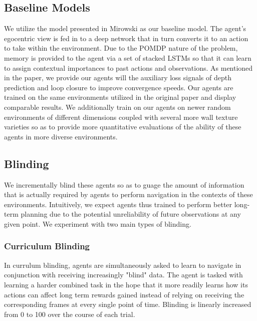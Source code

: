 
\subsection{Baseline Models}
We utilize the model presented in Mirowski \etal as our baseline model. The agent's egocentric view is fed in to a deep network that in turn converts it to an action to take within the environment. Due to the POMDP nature of the problem, memory is provided to the agent via a set of stacked LSTMs so that it can learn to assign contextual importances to past actions and observations. As mentioned in the paper, we provide our agents will the auxiliary loss signals of depth prediction and loop closure to improve convergence speeds. Our agents are trained on the same environments utilized in the original paper  and display comparable results. We additionally train on our agents on newer random environments of different dimensions coupled with several more wall texture varieties so as to provide more quantitative evaluations of the ability of these agents in more diverse environments.

\subsection{Blinding}
We incrementally blind these agents so as to guage the amount of information that is actually required by agents to perform navigation in the contexts of these environments. Intuitively, we expect agents thus trained to perform better long-term planning due to the potential unreliability of future observations at any given point. We experiment with two main types of blinding.  

\subsubsection{Curriculum Blinding}
In currulum blinding, agents are simultaneously asked to learn to navigate in conjunction with receiving increasingly "blind" data. The agent is tasked with learning a harder combined task in the hope that it more readily learns how its actions can affect long term rewards gained instead of relying on receiving the corresponding frames at every single point of time. Blinding is linearly increased from 0 to 100 over the course of each trial. 

